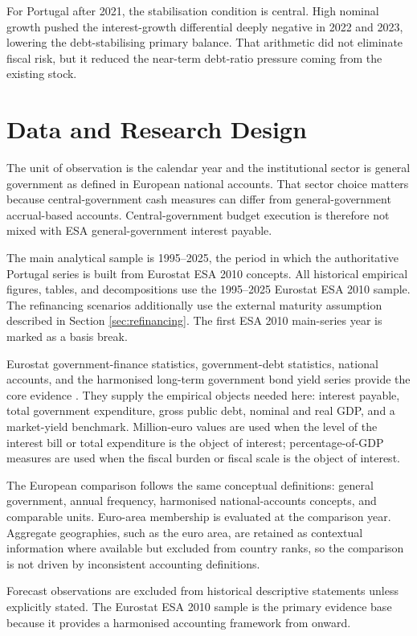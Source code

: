 \documentclass[11pt,a4paper]{article}
\begin{document}
For Portugal after 2021, the stabilisation condition is central. High nominal
growth pushed the interest-growth differential deeply negative in 2022 and
2023, lowering the debt-stabilising primary balance. That arithmetic did not
eliminate fiscal risk, but it reduced the near-term debt-ratio pressure coming
from the existing stock.

\section{Data and Research Design}

The unit of observation is the calendar year and the institutional sector is
general government as defined in European national accounts. That sector choice
matters because central-government cash measures can differ from
general-government accrual-based accounts. Central-government budget execution
is therefore not mixed with ESA general-government interest payable.

The main analytical sample is 1995--2025, the period in which the authoritative
Portugal series is built from Eurostat ESA 2010 concepts. All historical
empirical figures, tables, and decompositions use the 1995--2025 Eurostat ESA
2010 sample. The refinancing scenarios additionally use the external maturity
assumption described in Section \ref{sec:refinancing}. The first ESA 2010
main-series year is marked as a basis break.

Eurostat government-finance statistics, government-debt statistics, national
accounts, and the harmonised long-term government bond yield series provide the
core evidence \cite{eurostatgov}. They supply the empirical objects needed
here: interest payable, total government expenditure, gross public debt,
nominal and real GDP, and a market-yield benchmark. Million-euro values are
used when the level of the interest bill or total expenditure is the object of
interest; percentage-of-GDP measures are used when the fiscal burden or fiscal
scale is the object of interest.

The European comparison follows the same conceptual definitions: general
government, annual frequency, harmonised national-accounts concepts, and
comparable units. Euro-area membership is evaluated at the comparison year.
Aggregate geographies, such as the euro area, are retained as contextual
information where available but excluded from country ranks, so the comparison
is not driven by inconsistent accounting definitions.

Forecast observations are excluded from historical descriptive statements
unless explicitly stated. The Eurostat ESA 2010 sample is the primary evidence
base because it provides a harmonised accounting framework from
\MainStartYear{} onward.
\end{document}
